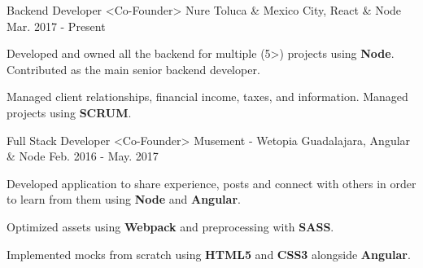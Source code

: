 \begin{cventries}
{\begin{cvitems}
      \end{cvitems}
    }
    \cventry
      {Backend Developer <Co-Founder>}
      {Nure}
      {Toluca \& Mexico City, React \& Node}
      {Mar. 2017 - Present}
      {
        \begin{cvitems}
          \item {Developed and owned all the backend for multiple (5>) projects using \textbf{Node}. Contributed as the main senior backend developer.}
           \item {Managed client relationships, financial income, taxes, and information. Managed projects using \textbf{SCRUM}.}
        \end{cvitems}
      }
    \cventry
      {Full Stack Developer <Co-Founder>}
      {Musement - Wetopia}
      {Guadalajara, Angular \& Node}
      {Feb. 2016 - May. 2017}
      {
        \begin{cvitems}
          \item {Developed application to share experience, posts and connect with others in order to learn from them using \textbf{Node} and \textbf{Angular}.}
          \item {Optimized assets using \textbf{Webpack} and preprocessing with \textbf{SASS}.}
          \item {Implemented mocks from scratch using \textbf{HTML5} and \textbf{CSS3} alongside \textbf{Angular}.}
        \end{cvitems}
      }
  \end{cventries}
